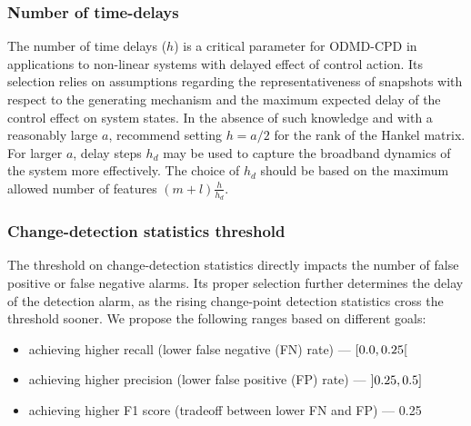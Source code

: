 \subsubsection{Number of time-delays}
The number of time delays (\(h\)) is a critical parameter for ODMD-CPD in applications to non-linear systems with delayed effect of control action. Its selection relies on assumptions regarding the representativeness of snapshots with respect to the generating mechanism and the maximum expected delay of the control effect on system states. In the absence of such knowledge and with a reasonably large \(a\), \citet{Moskvina2003} recommend setting \(h = a / 2\) for the rank of the Hankel matrix. For larger \(a\), delay steps \(h_d\) may be used to capture the broadband dynamics of the system more effectively. The choice of \(h_d\) should be based on the maximum allowed number of features \((m + l)\frac{h}{h_d}\).

\subsubsection{Change-detection statistics threshold}
The threshold on change-detection statistics directly impacts the number of false positive or false negative alarms. Its proper selection further determines the delay of the detection alarm, as the rising change-point detection statistics cross the threshold sooner. We propose the following ranges based on different goals:
\begin{itemize}
    \item achieving higher recall (lower false negative (FN) rate) --- \( \interval[open right]{0.0}{0.25} \)
    \item achieving higher precision (lower false positive (FP) rate) --- \( \interval[open left]{0.25}{0.5} \)
    \item achieving higher F1 score (tradeoff between lower FN and FP) --- 0.25
\end{itemize}
